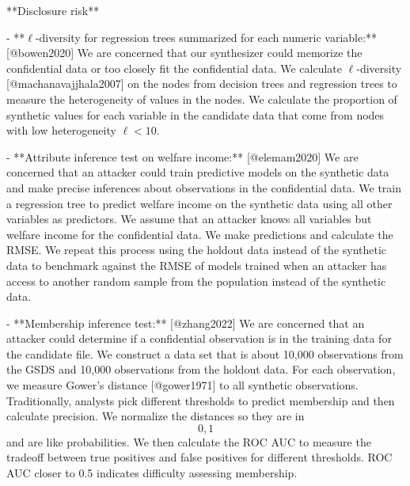 **Disclosure risk**

-   **$\ell$-diversity for regression trees summarized for each numeric variable:** [@bowen2020] We are concerned that our synthesizer could memorize the confidential data or too closely fit the confidential data. We calculate $\ell$-diversity [@machanavajjhala2007] on the nodes from decision trees and regression trees to measure the heterogeneity of values in the nodes. We calculate the proportion of synthetic values for each variable in the candidate data that come from nodes with low heterogeneity $\ell < 10$.

-   **Attribute inference test on welfare income:** [@elemam2020] We are concerned that an attacker could train predictive models on the synthetic data and make precise inferences about observations in the confidential data. We train a regression tree to predict welfare income on the synthetic data using all other variables as predictors. We assume that an attacker knows all variables but welfare income for the confidential data. We make predictions and calculate the RMSE. We repeat this process using the holdout data instead of the synthetic data to benchmark against the RMSE of models trained when an attacker has access to another random sample from the population instead of the synthetic data.

-   **Membership inference test:** [@zhang2022] We are concerned that an attacker could determine if a confidential observation is in the training data for the candidate file. We construct a data set that is about 10,000 observations from the GSDS and 10,000 observations from the holdout data. For each observation, we measure Gower's distance [@gower1971] to all synthetic observations. Traditionally, analysts pick different thresholds to predict membership and then calculate precision. We normalize the distances so they are in \[0, 1\] and are like probabilities. We then calculate the ROC AUC to measure the tradeoff between true positives and false positives for different thresholds. ROC AUC closer to 0.5 indicates difficulty assessing membership.